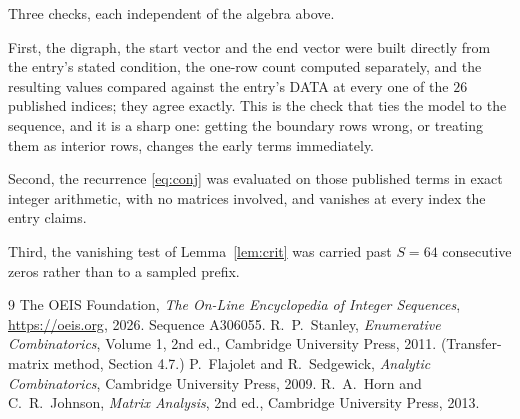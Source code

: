 \documentclass[11pt,a4paper]{article}
\theoremstyle{plain}
\theoremstyle{definition}
\begin{document}
Three checks, each independent of the algebra above.

First, the digraph, the start vector and the end vector were built directly from the
entry's stated condition, the one-row count computed separately, and the resulting values
compared against the entry's DATA at every one of the $26$ published indices; they
agree exactly. This is the check that ties the model to the sequence, and it is a sharp one:
getting the boundary rows wrong, or treating them as interior rows, changes the early terms
immediately.

Second, the recurrence \eqref{eq:conj} was evaluated on those published terms in exact
integer arithmetic, with no matrices involved, and vanishes at every index the entry claims.

Third, the vanishing test of Lemma~\ref{lem:crit} was carried past $S=64$ consecutive
zeros rather than to a sampled prefix.

\begin{thebibliography}{9}
 The OEIS Foundation, \emph{The On-Line Encyclopedia of Integer
Sequences}, \url{https://oeis.org}, 2026. Sequence A306055.
 R.~P.~Stanley, \emph{Enumerative Combinatorics}, Volume 1, 2nd ed.,
Cambridge University Press, 2011. (Transfer-matrix method, Section 4.7.)
 P.~Flajolet and R.~Sedgewick, \emph{Analytic Combinatorics}, Cambridge
University Press, 2009.
 R.~A.~Horn and C.~R.~Johnson, \emph{Matrix Analysis}, 2nd ed., Cambridge
University Press, 2013.
\end{thebibliography}
\end{document}
